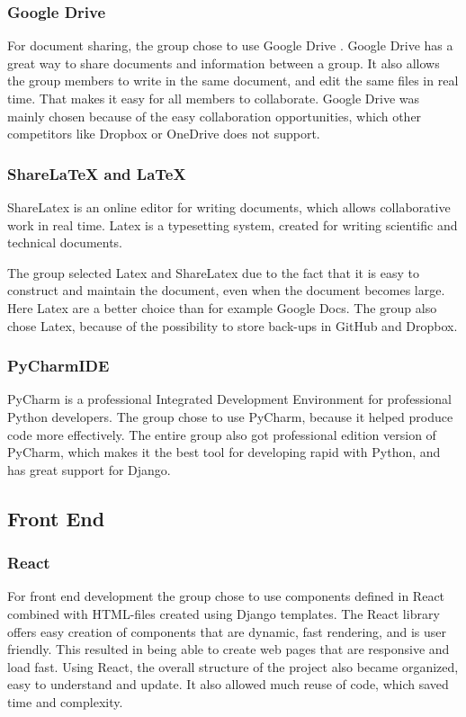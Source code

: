 \subsubsection{Google Drive}
For document sharing, the group chose to use Google Drive \cite{GoogleDrive}. Google Drive has a great way to share documents and information between a group. It also allows the group members to write in the same document, and edit the same files in real time. That makes it easy for all members to collaborate. Google Drive was mainly chosen because of the easy collaboration opportunities, which other competitors like Dropbox or OneDrive does not support. 

\subsubsection{ShareLaTeX and LaTeX}
ShareLatex \cite{ShareLatex} is an online editor for writing documents, which allows collaborative work in real time. Latex is a typesetting system, created for writing scientific and technical documents.

The group selected Latex and ShareLatex due to the fact that it is easy to construct and maintain the document, even when the document becomes large. Here Latex are a better choice than for example Google Docs. The group also chose Latex, because of the possibility to store back-ups in GitHub and Dropbox.

\subsubsection{PyCharmIDE}
PyCharm\cite{PyCharm} is a professional Integrated Development Environment for professional Python developers. The group chose to use PyCharm, because it helped produce code more effectively. The entire group also got professional edition version of PyCharm, which makes it the best tool for developing rapid with Python, and has great support for Django. 

\subsection{Front End}
\subsubsection{React}
For front end development the group chose to use components defined in React \cite{React} combined with HTML-files created using Django templates. The React library offers easy creation of components that are dynamic, fast rendering, and is user friendly. This resulted in being able to create web pages that are responsive and load fast. Using React, the overall structure of the project also became organized, easy to understand and update. It also allowed much reuse of code, which saved time and complexity. 

